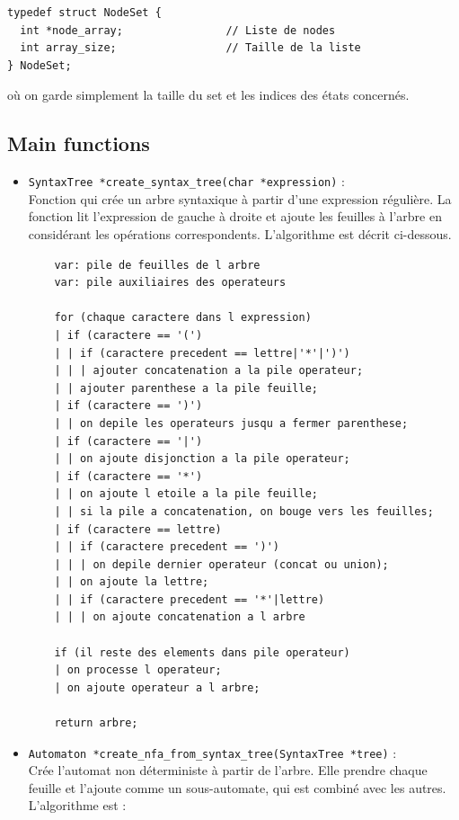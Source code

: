 \documentclass[12pt]{article}
\begin{document}
\begin{lstlisting}
typedef struct NodeSet {
  int *node_array;                // Liste de nodes
  int array_size;                 // Taille de la liste
} NodeSet;
\end{lstlisting}

\noindent où on garde simplement la taille du set et les indices des états concernés.

\subsection{Main functions}

\begin{itemize}
  \item \lstinline|SyntaxTree *create_syntax_tree(char *expression)| : \\
  Fonction qui crée un arbre syntaxique à partir d'une expression régulière. La fonction lit l'expression de gauche à droite et ajoute les feuilles à l'arbre en considérant les opérations correspondents. L'algorithme est décrit ci-dessous.

  \begin{lstlisting}
    var: pile de feuilles de l arbre
    var: pile auxiliaires des operateurs

    for (chaque caractere dans l expression)
    | if (caractere == '(')
    | | if (caractere precedent == lettre|'*'|')')
    | | | ajouter concatenation a la pile operateur;
    | | ajouter parenthese a la pile feuille;
    | if (caractere == ')')
    | | on depile les operateurs jusqu a fermer parenthese;
    | if (caractere == '|')
    | | on ajoute disjonction a la pile operateur;
    | if (caractere == '*')
    | | on ajoute l etoile a la pile feuille;
    | | si la pile a concatenation, on bouge vers les feuilles;
    | if (caractere == lettre)
    | | if (caractere precedent == ')')
    | | | on depile dernier operateur (concat ou union);
    | | on ajoute la lettre;
    | | if (caractere precedent == '*'|lettre)
    | | | on ajoute concatenation a l arbre
    
    if (il reste des elements dans pile operateur)
    | on processe l operateur;
    | on ajoute operateur a l arbre;

    return arbre;
  \end{lstlisting}

  \item \lstinline|Automaton *create_nfa_from_syntax_tree(SyntaxTree *tree)| : \\
  Crée l'automat non déterministe à partir de l'arbre. Elle prendre chaque feuille et l'ajoute comme un sous-automate, qui est combiné avec les autres. L'algorithme est : 


\end{itemize}
\end{document}
